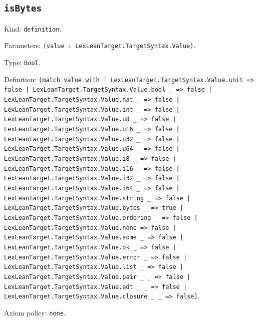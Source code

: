 \documentclass[11pt]{article}
\begin{document}
\subsection*{\texttt{isBytes}}
\noindent Kind: \texttt{definition}.\par
\noindent Parameters: \texttt{(value : LexLeanTarget.TargetSyntax.Value)}.\par
\noindent Type: \texttt{Bool}.\par
\noindent Definition: \texttt{(match value with | LexLeanTarget.TargetSyntax.Value.unit => false | LexLeanTarget.TargetSyntax.Value.bool \_ => false | LexLeanTarget.TargetSyntax.Value.nat \_ => false | LexLeanTarget.TargetSyntax.Value.int \_ => false | LexLeanTarget.TargetSyntax.Value.u8 \_ => false | LexLeanTarget.TargetSyntax.Value.u16 \_ => false | LexLeanTarget.TargetSyntax.Value.u32 \_ => false | LexLeanTarget.TargetSyntax.Value.u64 \_ => false | LexLeanTarget.TargetSyntax.Value.i8 \_ => false | LexLeanTarget.TargetSyntax.Value.i16 \_ => false | LexLeanTarget.TargetSyntax.Value.i32 \_ => false | LexLeanTarget.TargetSyntax.Value.i64 \_ => false | LexLeanTarget.TargetSyntax.Value.string \_ => false | LexLeanTarget.TargetSyntax.Value.bytes \_ => true | LexLeanTarget.TargetSyntax.Value.ordering \_ => false | LexLeanTarget.TargetSyntax.Value.none => false | LexLeanTarget.TargetSyntax.Value.some \_ => false | LexLeanTarget.TargetSyntax.Value.ok \_ => false | LexLeanTarget.TargetSyntax.Value.error \_ => false | LexLeanTarget.TargetSyntax.Value.list \_ => false | LexLeanTarget.TargetSyntax.Value.pair \_ \_ => false | LexLeanTarget.TargetSyntax.Value.adt \_ \_ => false | LexLeanTarget.TargetSyntax.Value.closure \_ \_ => false)}.\par
\noindent Axiom policy: \texttt{none}.\par
\end{document}
